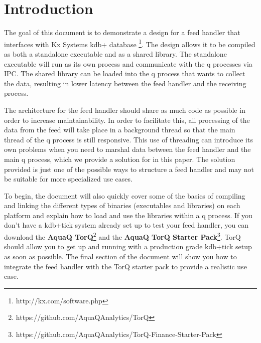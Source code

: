 \chapter{Introduction}

The goal of this document is to demonstrate a design for a feed handler that interfaces with Kx Systems kdb+ database \footnote{http://kx.com/software.php}. The design allows it to be compiled as both a standalone executable and as a shared library. The standalone executable will run as its own process and communicate with the q processes via IPC. The shared library can be loaded into the q process that wants to collect the data, resulting in lower latency between the feed handler and the receiving process.

The architecture for the feed handler should share as much code as possible in order to increase maintainability. In order to facilitate this, all processing of the data from the feed will take place in a background thread so that the main thread of the q process is still responsive. This use of threading can introduce its own problems when you need to marshal data between the feed handler and the main q process, which we provide a solution for in this paper. The solution provided is just one of the possible ways to structure a feed handler and may not be suitable for more specialized use cases.

To begin, the document will also quickly cover some of the basics of compiling and linking
the different types of binaries (executables and libraries) on each platform and explain
how to load and use the libraries within a q process. If you don't have a kdb+tick system
already set up to test your feed handler, you can download the \textbf{AquaQ TorQ}\footnote{https://github.com/AquaQAnalytics/TorQ} and the
\textbf{AquaQ TorQ Starter Pack}\footnote{https://github.com/AquaQAnalytics/TorQ-Finance-Starter-Pack}. TorQ should allow you to get up and running with a production grade kdb+tick setup as soon as possible. The final section of the document will show you how to integrate the feed handler with the TorQ starter pack to provide a realistic use case.





